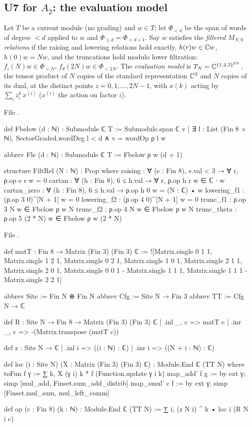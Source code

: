 \subsection{U7 for $A_2$: the evaluation model}

\begin{definition}\label{l26:def:evalmodel}
Let $T$ be a current module (no grading) and $w\in T$; let $\Phi_{<d}$ be the span of words of degree $<d$ applied to $w$
and $\Phi_{\le d}=\Phi_{<d+1}$. Say $w$ satisfies the \emph{filtered $M_{N,0}$ relations} if the raising and lowering
relations hold exactly, $h(r)w\in{\mathbb{C}} w$, $h(0)w=Nw$, and the truncations hold modulo lower filtration:
$f_i(N)w\in\Phi_{<N}$, $f_\theta(2N)w\in\Phi_{<2N}$. The \emph{evaluation model} is $T_N={\mathbb{C}}^{\{1,2,3\}^{2N}}$, the tensor
product of $N$ copies of the standard representation ${\mathbb{C}}^3$ and $N$ copies of its dual, at the distinct points
$z=0,1,\dots,2N-1$, with $x(k)$ acting by $\sum_iz_i^k\,x^{(i)}$ ($x^{(i)}$ the action on factor $i$).
\end{definition}
\noindent File .
\begin{leancode}
def Fbelow (d : ℕ) : Submodule ℂ T :=
  Submodule.span ℂ {v | ∃ l : List (Fin 8 × ℕ), SectorGraded.wordDeg l < d ∧ v = wordOp ρ l w}

abbrev Fle (d : ℕ) : Submodule ℂ T := Fbelow ρ w (d + 1)

structure FiltRel (N : ℕ) : Prop where
  raising : ∀ (e : Fin 8), e.val < 3 → ∀ r, ρ.op e r w = 0
  cartan : ∀ (h : Fin 8), 6 ≤ h.val → ∀ r, ρ.op h r w ∈ ℂ ∙ w
  cartan_zero : ∀ (h : Fin 8), 6 ≤ h.val → ρ.op h 0 w = (N : ℂ) • w
  lowering_f1 : (ρ.op 3 0)^[N + 1] w = 0
  lowering_f2 : (ρ.op 4 0)^[N + 1] w = 0
  trunc_f1 : ρ.op 3 N w ∈ Fbelow ρ w N
  trunc_f2 : ρ.op 4 N w ∈ Fbelow ρ w N
  trunc_theta : ρ.op 5 (2 * N) w ∈ Fbelow ρ w (2 * N)
\end{leancode}
\noindent File .
\begin{leancode}
def matT : Fin 8 → Matrix (Fin 3) (Fin 3) ℂ :=
  ![Matrix.single 0 1 1, Matrix.single 1 2 1, Matrix.single 0 2 1, Matrix.single 1 0 1,
    Matrix.single 2 1 1, Matrix.single 2 0 1, Matrix.single 0 0 1 - Matrix.single 1 1 1,
    Matrix.single 1 1 1 - Matrix.single 2 2 1]

abbrev Site := Fin N ⊕ Fin N
abbrev Cfg := Site N → Fin 3
abbrev TT := Cfg N → ℂ

def R : Site N → Fin 8 → Matrix (Fin 3) (Fin 3) ℂ
  | .inl _, c => matT c
  | .inr _, c => -(Matrix.transpose (matT c))

def z : Site N → ℂ
  | .inl i => ((i : ℕ) : ℂ)
  | .inr i => ((N + i : ℕ) : ℂ)

def loc (i : Site N) (X : Matrix (Fin 3) (Fin 3) ℂ) : Module.End ℂ (TT N) where
  toFun f γ := ∑ k, X (γ i) k * f (Function.update γ i k)
  map_add' f g := by ext γ; simp [mul_add, Finset.sum_add_distrib]
  map_smul' c f := by ext γ; simp [Finset.mul_sum, mul_left_comm]

def op (c : Fin 8) (k : ℕ) : Module.End ℂ (TT N) := ∑ i, (z N i) ^ k • loc i (R N i c)
\end{leancode}

